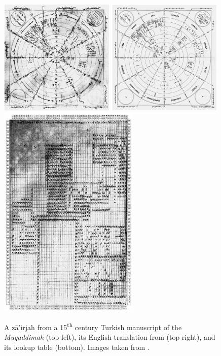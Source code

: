 \begin{figure}
\centering
  
\includegraphics[width=0.49\textwidth]{ch2/images/zairjah_front.png}
\includegraphics[width=0.49\textwidth]{ch2/images/zairjah_front_translation.png}\\
\includegraphics[width=0.6\textwidth,angle=90]{ch2/images/zairjah_back.png}
  
\caption{A z\={a}'irjah from a 15\textsuperscript{th} century Turkish
manuscript of the \textit{Muqaddimah} (top left), its English translation from
\cite{rosenthal1958muqaddimah} (top right), and its lookup table (bottom).
Images taken from \cite{link2010variantology}.}
\label{fig:zairjah}

\end{figure}
